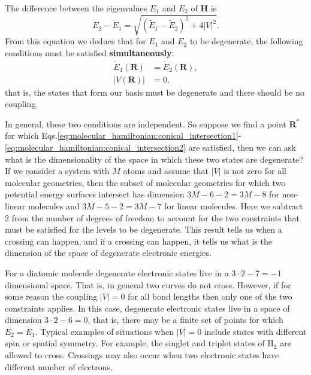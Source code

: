 \documentclass[../Main/chem532-notes.tex]{subfiles}
\begin{document}
The difference between the eigenvalues $E_1$ and $E_2$ of $\mathbf{H}$ is
\begin{equation}
E_2 - E_1 = \sqrt{(\tilde{E}_{1}-\tilde{E}_{2})^2 + 4 |V|^2 }.
\end{equation}
From this equation we deduce that for $E_1$ and $E_2$ to be degenerate, the following conditions must be satisfied \textbf{simultaneously}:
\begin{align}
\label{eq:molecular_hamiltonian:conical_intersection1}
\tilde{E}_{1}(\mathbf{R}) &= \tilde{E}_{2}(\mathbf{R}), \\
\label{eq:molecular_hamiltonian:conical_intersection2}
|V(\mathbf{R})| &= 0,
\end{align}
that is, the states that form our basis must be degenerate and there should be no coupling.

In general, these two conditions are independent. So suppose we find a point $\mathbf{R}^*$ for which Eqs.\eqref{eq:molecular_hamiltonian:conical_intersection1}-\eqref{eq:molecular_hamiltonian:conical_intersection2} are satisfied, then we can ask what is the dimensionality of the space in which these two states are degenerate?
If we consider a system with $M$ atoms and assume that $|V|$ is not zero for all molecular geometries, then the subset of molecular geometries for which two potential energy surfaces intersect has dimension $3M - 6 - 2 = 3M - 8$ for non-linear molecules and $3M - 5 - 2 = 3M - 7$ for linear molecules.
Here we subtract 2 from the number of degrees of freedom to account for the two constraints that must be satisfied for the levels to be degenerate.
This result tells us when a crossing can happen, and if a crossing can happen, it tells us what is the dimension of the space of degenerate electronic energies.

\begin{example}
For a diatomic molecule degenerate electronic states live in a $3 \cdot 2 - 7 = -1$ dimensional space.
That is, in general two curves do not cross.
However, if for some reason the coupling $|V| = 0$ for all bond lengths then only one of the two constraints applies.
In this case, degenerate electronic states live in a space of dimension $3 \cdot 2 - 6 = 0$, that is, there may be a finite set of points for which $E_2 = E_1$.
Typical examples of situations when $|V| = 0$ include states with different spin or spatial symmetry.  For example, the singlet and triplet states of H$_2$ are allowed to cross.
Crossings may also occur when two electronic states have different number of electrons.
\end{example}
\end{document}
